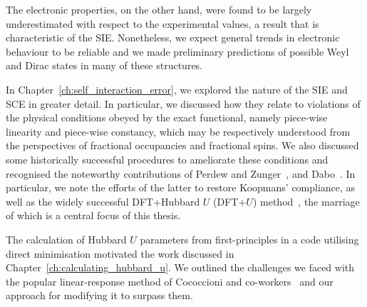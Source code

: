 %
The electronic properties, 
on the other hand, 
were found to be largely underestimated 
with respect to the experimental values, 
a result that is characteristic of the SIE.
%
Nonetheless, 
we expect general trends in electronic behaviour 
to be reliable and we made preliminary predictions 
of possible Weyl and Dirac states in many of these structures.
%


In Chapter~\ref{ch:self_interaction_error}, 
we explored the nature of the 
SIE and SCE in greater detail.
%
In particular, 
we discussed how they relate to violations of the 
physical conditions obeyed by the exact functional, 
namely piece-wise linearity and piece-wise constancy, 
which may be respectively understood from the perspectives of 
fractional occupancies and fractional spins.
%
We also discussed some historically successful 
procedures to ameliorate these conditions 
and recognised the noteworthy contributions 
of Perdew and Zunger~\cite{PhysRevB.23.5048}, 
and Dabo~\cite{PhysRevB.82.115121}.
%
In particular, 
we note the efforts of the latter to 
restore Koopmans' compliance, 
as well as the widely successful 
DFT+Hubbard $U$ (DFT+$U$) method~\cite{QUA:QUA24521}, 
the marriage of which is a central focus of this thesis.

The calculation of Hubbard $U$ parameters from first-principles 
in a code utilising direct minimisation 
motivated the work discussed in Chapter~\ref{ch:calculating_hubbard_u}.
%
We outlined the challenges we faced 
with the popular linear-response method  
of Cococcioni and co-workers~\cite{PhysRevB.71.035105,PhysRevB.84.115108}
and our approach for modifying it to surpass them.

